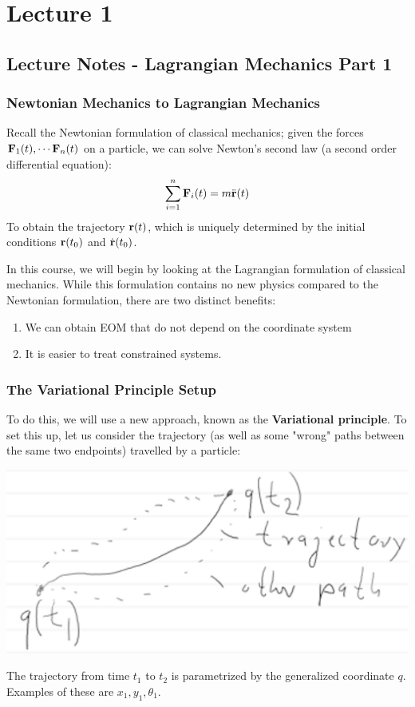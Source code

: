 \section{Lecture 1}
\subsection{Lecture Notes - Lagrangian Mechanics Part 1}
\subsubsection{Newtonian Mechanics to Lagrangian Mechanics}
Recall the Newtonian formulation of classical mechanics; given the forces $\mathbf{F}_1(t), \cdots \mathbf{F}_n(t)$ on a particle, we can solve Newton's second law (a second order differential equation):
\[\sum_{i=1}^n \mathbf{F}_i(t) = m \ddot{\mathbf{r}}(t)\]
To obtain the trajectory $\mathbf{r}(t)$, which is uniquely determined by the initial conditions $\mathbf{r}(t_0)$ and $\dot{\mathbf{r}}(t_0)$. 

In this course, we will begin by looking at the Lagrangian formulation of classical mechanics. While this formulation contains no new physics compared to the Newtonian formulation, there are two distinct benefits:
\begin{enumerate}
    \item We can obtain EOM that do not depend on the coordinate system
    \item It is easier to treat constrained systems. 
\end{enumerate}
\subsubsection{The Variational Principle Setup}
To do this, we will use a new approach, known as the \textbf{Variational principle}. To set this up, let us consider the trajectory (as well as some "wrong" paths between the same two endpoints) travelled by a particle:
\begin{center}
    \includegraphics[scale=0.4]{Lecture-1/L1-img1.png}
\end{center}
The trajectory from time $t_1$ to $t_2$ is parametrized by the generalized coordinate $q$. Examples of these are $x_1, y_1, \theta_1$. 
